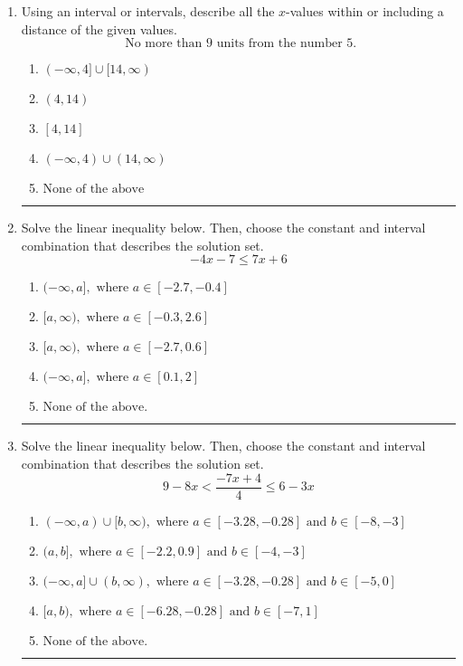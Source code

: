 \documentclass[14pt]{extbook}
\newcommand{\litem}[1]{\item#1\hspace*{-1cm}\rule{\textwidth}{0.4pt}}
\begin{document}
\begin{enumerate}
\litem{
Using an interval or intervals, describe all the $x$-values within or including a distance of the given values.\[ \text{ No more than } 9 \text{ units from the number } 5. \]\begin{enumerate}[label=\Alph*.]
\item \( (-\infty, 4] \cup [14, \infty) \)
\item \( (4, 14) \)
\item \( [4, 14] \)
\item \( (-\infty, 4) \cup (14, \infty) \)
\item \( \text{None of the above} \)

\end{enumerate} }
\litem{
Solve the linear inequality below. Then, choose the constant and interval combination that describes the solution set.\[ -4x -7 \leq 7x + 6 \]\begin{enumerate}[label=\Alph*.]
\item \( (-\infty, a], \text{ where } a \in [-2.7, -0.4] \)
\item \( [a, \infty), \text{ where } a \in [-0.3, 2.6] \)
\item \( [a, \infty), \text{ where } a \in [-2.7, 0.6] \)
\item \( (-\infty, a], \text{ where } a \in [0.1, 2] \)
\item \( \text{None of the above}. \)

\end{enumerate} }
\litem{
Solve the linear inequality below. Then, choose the constant and interval combination that describes the solution set.\[ 9 - 8 x < \frac{-7 x + 4}{4} \leq 6 - 3 x \]\begin{enumerate}[label=\Alph*.]
\item \( (-\infty, a) \cup [b, \infty), \text{ where } a \in [-3.28, -0.28] \text{ and } b \in [-8, -3] \)
\item \( (a, b], \text{ where } a \in [-2.2, 0.9] \text{ and } b \in [-4, -3] \)
\item \( (-\infty, a] \cup (b, \infty), \text{ where } a \in [-3.28, -0.28] \text{ and } b \in [-5, 0] \)
\item \( [a, b), \text{ where } a \in [-6.28, -0.28] \text{ and } b \in [-7, 1] \)
\item \( \text{None of the above.} \)


\end{enumerate}}
\end{enumerate}
\end{document}
